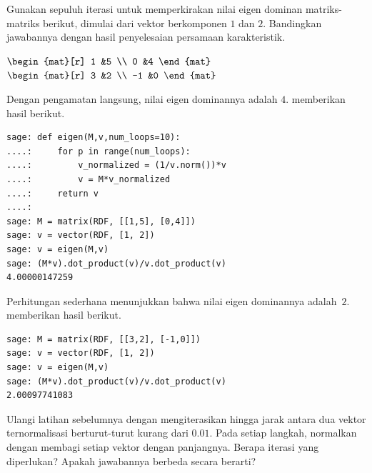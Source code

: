 \begin{exercises}
  \item 
    Gunakan sepuluh iterasi untuk memperkirakan nilai eigen dominan matriks-
    matriks berikut, dimulai dari vektor berkomponen $1$ dan $2$.
    Bandingkan jawabannya dengan hasil penyelesaian persamaan karakteristik.
    \begin{exparts*}
      \partsitem $\begin{mat}[r]
                    1  &5  \\
                    0  &4
                  \end{mat}$
      \partsitem $\begin{mat}[r]
                    3   &2  \\
                    -1  &0
                  \end{mat}$
    \end{exparts*}
    \begin{answer}
     \begin{exparts}
       \partsitem Dengan pengamatan langsung, nilai eigen dominannya adalah $4$.
         \Sage{} memberikan hasil berikut.
\begin{lstlisting}
sage: def eigen(M,v,num_loops=10):
....:     for p in range(num_loops):
....:         v_normalized = (1/v.norm())*v
....:         v = M*v_normalized
....:     return v 
....: 
sage: M = matrix(RDF, [[1,5], [0,4]])
sage: v = vector(RDF, [1, 2])
sage: v = eigen(M,v)
sage: (M*v).dot_product(v)/v.dot_product(v)
4.00000147259
\end{lstlisting}
       \partsitem Perhitungan sederhana menunjukkan bahwa nilai eigen dominannya
          adalah~$2$.
          \Sage{} memberikan hasil berikut.
\begin{lstlisting}
sage: M = matrix(RDF, [[3,2], [-1,0]])
sage: v = vector(RDF, [1, 2])
sage: v = eigen(M,v)
sage: (M*v).dot_product(v)/v.dot_product(v)
2.00097741083
\end{lstlisting}
     \end{exparts}
    \end{answer}
  \item 
     Ulangi latihan sebelumnya dengan mengiterasikan hingga jarak antara dua
     vektor ternormalisasi berturut-turut kurang dari $0.01$.
     Pada setiap langkah, normalkan dengan membagi setiap vektor dengan
     panjangnya. Berapa iterasi yang diperlukan? Apakah jawabannya berbeda
     secara berarti?
     \begin{answer}
       \begin{exparts}

\end{exparts}
\end{answer}
\end{exercises}
